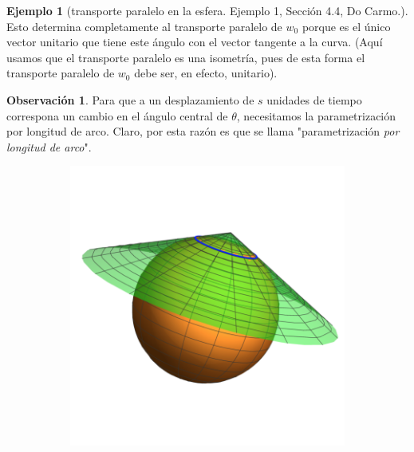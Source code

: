 \documentclass[spanish]{book}
\theoremstyle{definition}
\newtheorem*{obs}{Observación}
\newtheorem*{ejem}{Ejemplo}
\begin{document}
\begin{ejem}[transporte paralelo en la esfera. Ejemplo 1, Sección 4.4, Do Carmo.]
	Esto determina completamente al transporte paralelo de $w_0$ porque es el único vector unitario que tiene este ángulo con el vector tangente a la curva. (Aquí usamos que el transporte paralelo es una isometría, pues de esta forma el transporte paralelo de $w_0$ debe ser, en efecto, unitario).
	
	\begin{obs}
		Para que a un desplazamiento de $s$ unidades de tiempo correspona un cambio en el ángulo central de $\theta$, necesitamos la parametrización por longitud de arco. Claro, por esta razón es que se llama "parametrización \textit{por longitud de arco}".
	\end{obs} 
	\vspace{-1cm}
	\begin{figure}[H]
		\begin{subfigure}{0.5\textwidth}
			\centering
			\includegraphics[width=\linewidth]{gauss8}
		\end{subfigure}
		\begin{subfigure}{0.5\textwidth}
			\centering

\end{subfigure}
\end{figure}
\end{ejem}
\end{document}
